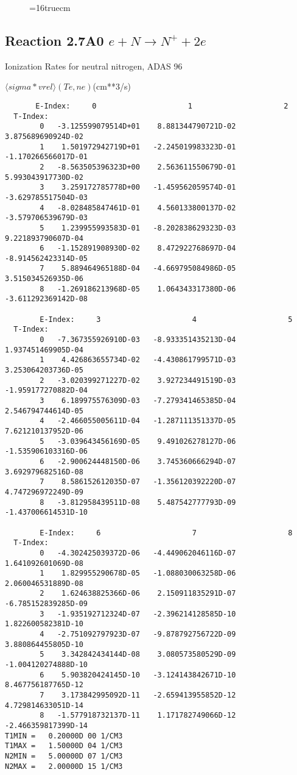 \documentclass[12pt,dvipdfmx]{article}
\begin{document}
\begin{figure} \label{2.6A0}
\epsfxsize=16truecm
\end{figure}
\newpage

\subsection{
Reaction 2.7A0 $e + N \rightarrow N^+  + 2e $ }
  Ionization Rates for neutral  nitrogen,   ADAS 96

$  \langle sigma*vrel \rangle(Te,ne) $(cm**3/s)
\begin{small}\begin{verbatim}
       E-Index:     0                     1                     2
  T-Index:
        0   -3.125599079514D+01    8.881344790721D-02    3.875689690924D-02
        1    1.501972942719D+01   -2.245019983323D-01   -1.170266566017D-01
        2   -8.563505396323D+00    2.563611550679D-01    5.993043917730D-02
        3    3.259172785778D+00   -1.459562059574D-01   -3.629785517504D-03
        4   -8.028485847461D-01    4.560133800137D-02   -3.579706539679D-03
        5    1.239955993583D-01   -8.202838629323D-03    9.221893790607D-04
        6   -1.152891908930D-02    8.472922768697D-04   -8.914562423314D-05
        7    5.889464965188D-04   -4.669795084986D-05    3.515034526935D-06
        8   -1.269186213968D-05    1.064343317380D-06   -3.611292369142D-08

        E-Index:     3                     4                     5
  T-Index:
        0   -7.367355926910D-03   -8.933351435213D-04    1.937451469905D-04
        1    4.426863655734D-02   -4.430861799571D-03    3.253064203736D-05
        2   -3.020399271227D-02    3.927234491519D-03   -1.959177270882D-04
        3    6.189975576309D-03   -7.279341465385D-04    2.546794744614D-05
        4   -2.466055005611D-04   -1.287111351337D-05    7.621210137952D-06
        5   -3.039643456169D-05    9.491026278127D-06   -1.535906103316D-06
        6   -2.900624448150D-06    3.745360666294D-07    3.692979682516D-08
        7    8.586152612035D-07   -1.356120392220D-07    4.747296972249D-09
        8   -3.812958439511D-08    5.487542777793D-09   -1.437006614531D-10

        E-Index:     6                     7                     8
  T-Index:
        0   -4.302425039372D-06   -4.449062046116D-07    1.641092601069D-08
        1    1.829955290678D-05   -1.088030063258D-06    2.060046531889D-08
        2    1.624638825366D-06    2.150911835291D-07   -6.785152839285D-09
        3   -1.935192712324D-07   -2.396214128585D-10    1.822600582381D-10
        4   -2.751092797923D-07   -9.878792756722D-09    3.880864455805D-10
        5    3.342842434144D-08    3.080573580529D-09   -1.004120274888D-10
        6    5.903820424145D-10   -3.124143842671D-10    8.467756187765D-12
        7    3.173842995092D-11   -2.659413955852D-12    4.729814633051D-14
        8   -1.577918732137D-11    1.171782749066D-12   -2.466359817399D-14
T1MIN =   0.20000D 00 1/CM3
T1MAX =   1.50000D 04 1/CM3
N2MIN =   5.00000D 07 1/CM3
N2MAX =   2.00000D 15 1/CM3


\end{verbatim}
\end{small}
\end{document}
